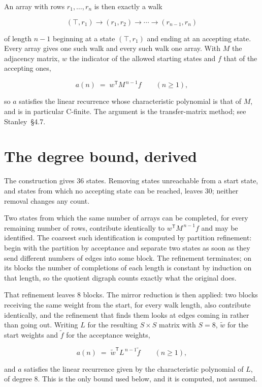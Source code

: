 \documentclass[11pt]{article}
\theoremstyle{definition}
\begin{document}
An array with rows $r_1,\dots,r_n$ is then exactly a walk

\[(\top,r_1) \to (r_1,r_2) \to \cdots \to (r_{n-1},r_n)\]

of length $n-1$ beginning at a state $(\top,r_1)$ and ending at an accepting state. Every array gives one such walk and every such walk one array. With $M$ the adjacency matrix, $w$ the indicator of the allowed starting states and $f$ that of the accepting ones,

\[a(n) \;=\; w^{\mathsf T} M^{\,n-1} f \qquad (n \ge 1),\]

so $a$ satisfies the linear recurrence whose characteristic polynomial is that of $M$, and is in particular C-finite. The argument is the transfer-matrix method; see Stanley~\S4.7.

\section{The degree bound, derived}

The construction gives $36$ states. Removing states unreachable from a start state, and states from which no accepting state can be reached, leaves $30$; neither removal changes any count.

Two states from which the same number of arrays can be completed, for every remaining number of rows, contribute identically to $w^{\mathsf T}M^{\,n-1}f$ and may be identified. The coarsest such identification is computed by partition refinement: begin with the partition by acceptance and separate two states as soon as they send different numbers of edges into some block. The refinement terminates; on its blocks the number of completions of each length is constant by induction on that length, so the quotient digraph counts exactly what the original does.

That refinement leaves $8$ blocks. The mirror reduction is then applied: two blocks receiving the same weight from the start, for every walk length, also contribute identically, and the refinement that finds them looks at edges coming in rather than going out. Writing $L$ for the resulting $S \times S$ matrix with $S = 8$, $\tilde w$ for the start weights and $\tilde f$ for the acceptance weights,

\[a(n) \;=\; \tilde w^{\mathsf T} L^{\,n-1} \tilde f \qquad (n \ge 1),\]

and $a$ satisfies the linear recurrence given by the characteristic polynomial of $L$, of degree $8$. This is the only bound used below, and it is computed, not assumed.
\end{document}
